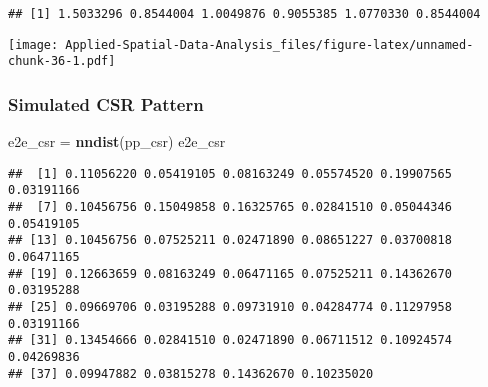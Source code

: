 \documentclass[
]{book}
\newenvironment{Shaded}{\begin{snugshade}}{\end{snugshade}}
\newcommand{\CommentTok}[1]{\textcolor[rgb]{0.56,0.35,0.01}{\textit{#1}}}
\newcommand{\ControlFlowTok}[1]{\textcolor[rgb]{0.13,0.29,0.53}{\textbf{#1}}}
\newcommand{\DataTypeTok}[1]{\textcolor[rgb]{0.13,0.29,0.53}{#1}}
\newcommand{\DecValTok}[1]{\textcolor[rgb]{0.00,0.00,0.81}{#1}}
\newcommand{\KeywordTok}[1]{\textcolor[rgb]{0.13,0.29,0.53}{\textbf{#1}}}
\newcommand{\NormalTok}[1]{#1}
\newcommand{\OperatorTok}[1]{\textcolor[rgb]{0.81,0.36,0.00}{\textbf{#1}}}
\newcommand{\StringTok}[1]{\textcolor[rgb]{0.31,0.60,0.02}{#1}}
\begin{document}
\begin{verbatim}
## [1] 1.5033296 0.8544004 1.0049876 0.9055385 1.0770330 0.8544004
\end{verbatim}

\begin{Shaded}
\end{Shaded}

\texttt{[image: Applied-Spatial-Data-Analysis\_files/figure-latex/unnamed-chunk-36-1.pdf]}

\hypertarget{simulated-csr-pattern-1}{%
\subsubsection{Simulated CSR Pattern}\label{simulated-csr-pattern-1}}

\begin{Shaded}
\begin{Highlighting}[]
\NormalTok{e2e_csr =}\StringTok{ }\KeywordTok{nndist}\NormalTok{(pp_csr)}
\NormalTok{e2e_csr}
\end{Highlighting}
\end{Shaded}

\begin{verbatim}
##  [1] 0.11056220 0.05419105 0.08163249 0.05574520 0.19907565 0.03191166
##  [7] 0.10456756 0.15049858 0.16325765 0.02841510 0.05044346 0.05419105
## [13] 0.10456756 0.07525211 0.02471890 0.08651227 0.03700818 0.06471165
## [19] 0.12663659 0.08163249 0.06471165 0.07525211 0.14362670 0.03195288
## [25] 0.09669706 0.03195288 0.09731910 0.04284774 0.11297958 0.03191166
## [31] 0.13454666 0.02841510 0.02471890 0.06711512 0.10924574 0.04269836
## [37] 0.09947882 0.03815278 0.14362670 0.10235020
\end{verbatim}
\end{document}
